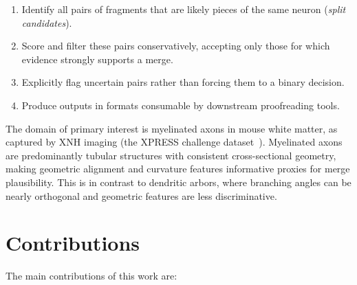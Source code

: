 \begin{enumerate}
  \item Identify all pairs of fragments that are likely pieces of the same neuron
        (\emph{split candidates}).
  \item Score and filter these pairs conservatively, accepting only those for which
        evidence strongly supports a merge.
  \item Explicitly flag uncertain pairs rather than forcing them to a binary decision.
  \item Produce outputs in formats consumable by downstream proofreading tools.
\end{enumerate}

The domain of primary interest is myelinated axons in mouse white matter,
as captured by XNH imaging (the XPRESS challenge dataset~\cite{xpress2023}).
Myelinated axons are predominantly tubular structures with consistent cross-sectional
geometry, making geometric alignment and curvature features informative proxies
for merge plausibility. This is in contrast to dendritic arbors, where branching
angles can be nearly orthogonal and geometric features are less discriminative.

\section*{Contributions}

The main contributions of this work are:

